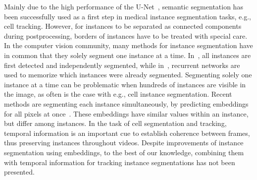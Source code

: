 \documentclass[runningheads,a4paper]{llncs}
\begin{document}

Mainly due to the high performance of the U-Net~\cite{Ronneberger2015}, semantic segmentation has been successfully used as a first step in medical instance segmentation tasks, e.g., cell tracking.
However, for instances to be separated as connected components during postprocessing, borders of instances have to be treated with special care.
In the computer vision community, many methods for instance segmentation have in common that they solely segment one instance at a time.
In~\cite{He2017}, all instances are first detected and independently segmented, while in~\cite{Ren2017}, recurrent networks are used to memorize which instances were already segmented.
Segmenting solely one instance at a time can be problematic when hundreds of instances are visible in the image, as often is the case with e.g., cell instance segmentation.
Recent methods are segmenting each instance simultaneously, by predicting embeddings for all pixels at once~\cite{Newell2017,Kong2017}.
These embeddings have similar values within an instance, but differ among instances.
In the task of cell segmentation and tracking, temporal information is an important cue to establish coherence between frames, thus preserving instances throughout videos.
Despite improvements of instance segmentation using embeddings, to the best of our knowledge, combining them with temporal information for tracking instance segmentations has not been presented.
\end{document}
